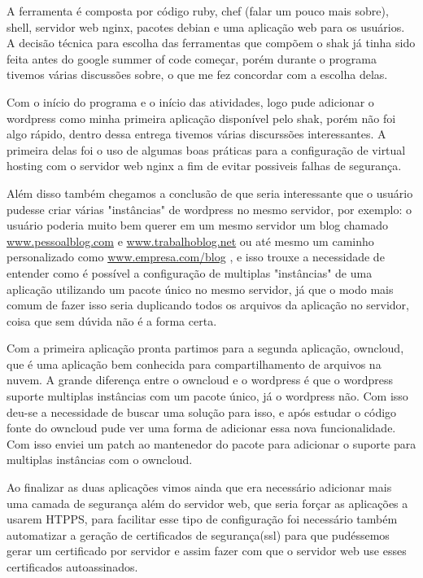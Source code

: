 A ferramenta é composta por código ruby, chef (falar um pouco mais sobre), shell,
servidor web nginx, pacotes debian e uma aplicação web para os usuários. A decisão
técnica para escolha das ferramentas que compõem o shak já tinha sido feita antes do google summer of
code começar, porém durante o programa tivemos várias discussões sobre, o que me
fez concordar com a escolha delas.

Com o início do programa e o início das atividades, logo pude adicionar o wordpress
como minha primeira aplicação disponível pelo shak, porém não foi algo rápido, dentro
dessa entrega tivemos várias discurssões interessantes. A primeira delas foi
o uso de algumas boas práticas para a configuração de virtual hosting com  o
servidor web nginx a fim de evitar possiveis falhas de segurança.

Além disso também chegamos a conclusão de que seria interessante que o usuário pudesse
criar várias "instâncias" de wordpress no mesmo servidor, por exemplo: o usuário
poderia muito bem querer em um mesmo servidor um blog chamado \url{www.pessoalblog.com}
e \url{www.trabalhoblog.net} ou até mesmo um caminho personalizado como \url{www.empresa.com/blog}
, e isso trouxe a necessidade de entender como é possível
a configuração de multiplas "instâncias" de uma aplicação utilizando um pacote
único no mesmo servidor, já que o modo mais comum de fazer isso seria duplicando
 todos os arquivos da aplicação no servidor, coisa que sem dúvida não é a forma certa.

Com a primeira aplicação pronta partimos para a segunda aplicação, owncloud, que
é uma aplicação bem conhecida para compartilhamento de arquivos na nuvem. A grande
diferença entre o owncloud e o wordpress é que o wordpress suporte multiplas
instâncias com um pacote único, já o wordpress não. Com isso deu-se a necessidade de
buscar uma solução para isso, e após estudar o código fonte do owncloud pude
ver uma forma de adicionar essa nova funcionalidade. Com isso enviei um
patch ao mantenedor do pacote para adicionar o suporte para multiplas instâncias
com o owncloud.

Ao finalizar as duas aplicações vimos ainda que era necessário adicionar mais
uma camada de segurança além do servidor web, que seria forçar as aplicações
a usarem HTPPS, para facilitar esse tipo de configuração foi necessário também
automatizar a geração de certificados de segurança(ssl) para que pudéssemos gerar
um certificado por servidor e assim fazer com que o servidor web use esses certificados
autoassinados.

